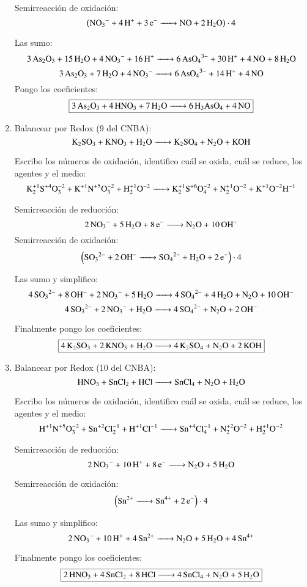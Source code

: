 \begin{enumerate}
\begin{multicols}{2}
Semirreacción de oxidación:
$$\left(\ce{
NO_3^{-} + 4H^+ +3e^- -> NO + 2H2O
}\right)\cdot 4$$
\end{multicols}

Las sumo:
$$\ce{
3As2O3 + 15H2O + 4NO3^- + 16H^+ -> 6AsO_4^{3-} + 30H^+ + 4NO + 8 H2O
}$$
$$\ce{
3As2O3 + 7H2O + 4NO3^- -> 6AsO_4^{3-} + 14H^+ + 4NO
}$$
Pongo los coeficientes:
$$\fbox{\ce{
3As2O3 + 4HNO3 + 7H2O -> 6H3AsO4 + 4NO}}$$


\newpage
\item
Balancear por Redox (9 del CNBA):
$$\ce{K2SO3 + KNO3 + H2O ->
K2SO4 + N2O + KOH}$$

Escribo los números de oxidación, identifico cuál se oxida, cuál se reduce, los agentes y el medio:
$$\ce{
K^{+1}2S^{+4}O^{-2}3 + K^{+1}N^{+5}O^{-2}3 + H^{+1}2O^{-2} ->
K^{+1}2S^{+6}O^{-2}4 + N^{+1}2O^{-2} + K^{+1}O^{-2}H^{-1}
}$$


\begin{multicols}{2}
Semirreacción de reducción:
$$\ce{
2NO_3^{-} + 5 H2O + 8e^- ->
N2O + 10OH^-
}$$
Semirreacción de oxidación:
$$\left(\ce{
SO3^{2-} + 2OH^- ->
SO4^{2-} + H2O + 2e^-
}\right)\cdot 4$$
\end{multicols}

Las sumo y simplifico:
$$\ce{
4SO3^{2-} + 8OH^- + 2NO_3^- + 5H2O ->
4SO_4^{2-} + 4 H2O + N2O + 10OH^-
}$$
$$\ce{
4SO3^{2-} + 2NO_3^- + H2O ->
4SO_4^{2-} + N2O + 2OH^-
}$$

Finalmente pongo los coeficientes:
$$\fbox{\ce{4K2SO3 + 2KNO3 + H2O ->
4K2SO4 + N2O + 2KOH}}$$


\item
Balancear por Redox (10 del CNBA):
$$\ce{
HNO3 + SnCl2 + HCl ->
SnCl4 + N2O + H2O
}$$

Escribo los números de oxidación, identifico cuál se oxida, cuál se reduce, los agentes y el medio:
$$\ce{
H^{+1}N^{+5}O^{-2}3 + Sn^{+2}Cl^{-1}2 + H^{+1}Cl^{-1} ->
Sn^{+4}Cl^{-1}4 + N^{+2}2O^{-2} + H^{+1}2O^{-2}
}$$


\begin{multicols}{2}
Semirreacción de reducción:
$$\ce{
2NO_3^- +10H^+ + 8e^- ->
N2O + 5H2O
}$$

Semirreacción de oxidación:
$$\left(\ce{
Sn^{2+} ->
Sn^{4+} + 2e^-
}\right)\cdot 4$$
\end{multicols}

Las sumo y simplifico:
$$\ce{
2NO_3^- + 10H^+ + 4Sn^{2+} ->
N2O + 5H2O + 4Sn^{4+}
}$$

Finalmente pongo los coeficientes:
$$\fbox{\ce{
2HNO3 + 4SnCl2 + 8HCl ->
4SnCl4 + N2O + 5H2O
}}$$
\end{enumerate}
